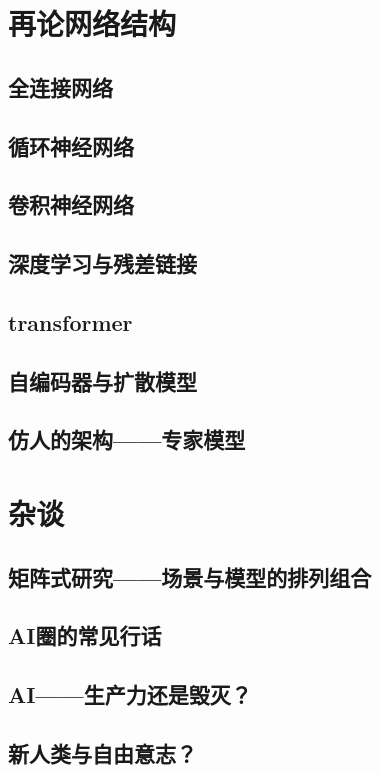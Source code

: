 \documentclass[UTF8, 12pt]{article}
\begin{document}
\section{再论网络结构} %
\subsection{全连接网络}
\subsection{循环神经网络}
\subsection{卷积神经网络}
\subsection{深度学习与残差链接}
\subsection{transformer}
\subsection{自编码器与扩散模型}
\subsection{仿人的架构——专家模型}

\section{杂谈}
\subsection{矩阵式研究——场景与模型的排列组合}
\subsection{AI圈的常见行话}
\subsection{AI——生产力还是毁灭？}
\subsection{新人类与自由意志？}
\end{document}
